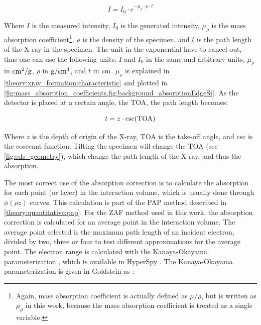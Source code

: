 \begin{equation}
    \label{eq:theory:quantitative:absorption}
    I = I_0 \cdot e^{-\mu_{\rho} \cdot \rho \cdot t}
\end{equation}

Where $I$ is the measured intensity, $I_0$ is the generated intensity, $\mu_{\rho}$ is the mass absorption coefficient\footnote{Again, mass absorption coefficient is actually defined as $\mu/\rho$, but is written as $\mu_\rho$ in this work, because the mass absorption coefficient is treated as a single variable.},
$\rho$ is the density of the specimen, and $t$ is the path length of the X-ray in the specimen.
The unit in the exponential have to cancel out, thus one can use the following units: $I$ and $I_0$ in the same and arbitrary units, $\mu_{\rho}$ in $\textnormal{cm}^2/\textnormal{g}$, $\rho$ in $\textnormal{g}/\textnormal{cm}^3$, and $t$ in $\textnormal{cm}$.
$\mu_{\rho}$ is explained in \cref{theory:xray_formation:characteristic} and plotted in \cref{fig:mass_absorption_coefficients,fig:background_absorptionEdgeSi}. 
As the detector is placed at a certain angle, the TOA, the path length becomes:

\begin{equation}
    \label{eq:theory:quantitative:path_length}
    t = z \cdot \csc(\textnormal{TOA})
\end{equation}

Where $z$ is the depth of origin of the X-ray, TOA is the take-off angle, and csc is the cosecant function.
Tilting the specimen will change the TOA (see \cref{fig:eds_geometry}), which change the path length of the X-ray, and thus the absorption.


The most correct use of the absorption correction is to calculate the absorption for each point (or layer) in the interaction volume, which is usually done through $\phi(\rho z)$ curves.
This calculation is part of the PAP method described in \cref{theory:quantitative:pap}.
For the ZAF method used in this work, the absorption correction is calculated for an average point in the interaction volume.
The average point selected is the maximum path length of an incident electron, divided by two, three or four to test different approximations for the average point.
The electron range is calculated with the Kanaya-Okayama parameterization \cite{kanaya1972}, which is available in HyperSpy \cite{hyperspy_1.7.1}.
The Kanaya-Okayama parameterization is given in Goldstein as \cite[22.5]{goldstein_scanning_2018}:


